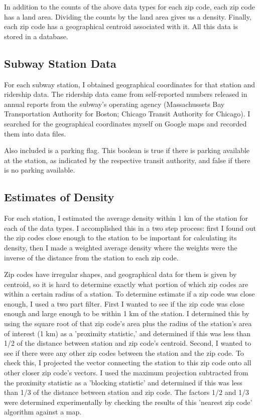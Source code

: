 \documentclass{article}
\begin{document}
In addition to the counts of the above data types for each zip code, each zip code has a land area. Dividing the counts by the land area gives us a density. Finally, each zip code has a geographical centroid associated with it. All this data is stored in a database. 

\subsection{Subway Station Data}

For each subway station, I obtained geographical coordinates for that station and ridership data. The ridership data came from self-reported numbers released in annual reports from the subway's operating agency (Massachussets Bay Transportation Authority for Boston; Chicago Transit Authority for Chicago). I searched for the geographical coordinates myself on Google maps and recorded them into data files.

Also included is a parking flag. This boolean is true if there is parking available at the station, as indicated by the respective transit authority, and false if there is no parking available.

\subsection{Estimates of Density}

For each station, I estimated the average density within 1 km of the station for each of the data types. I accomplished this in a two step process: first I found out the zip codes close enough to the station to be important for calculating its density, then I made a weighted average density where the weights were the inverse of the distance from the station to each zip code.

Zip codes have irregular shapes, and geographical data for them is given by centroid, so it is hard to determine exactly what portion of which zip codes are within a certain radius of a station. To determine estimate if a zip code was close enough, I used a two part filter. First I wanted to see if the zip code was close enough and large enough to be within 1 km of the station. I determined this by using the square root of that zip code's area plus the radius of the station's area of interest (1 km) as a 'proximity statistic,' and determined if this was less than 1/2 of the distance between station and zip code's centroid. Second, I wanted to see if there were any other zip codes between the station and the zip code. To check this, I projected the vector connecting the station to this zip code onto all other closer zip code's vectors. I used the maximum projection subtracted from the proximity statistic as a 'blocking statistic' and determined if this was less than 1/3 of the distance between station and zip code. The factors 1/2 and 1/3 were determined experimentally by checking the results of this 'nearest zip code' algorithm against a map.
\end{document}
